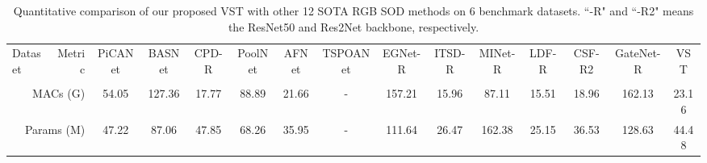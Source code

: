 \documentclass[10pt,twocolumn,letterpaper]{article}
\begin{document}
\begin{table*}[t]
  \centering
  \footnotesize
  \renewcommand{\arraystretch}{1.0}
  \renewcommand{\tabcolsep}{1mm}
 \caption{Quantitative comparison of our proposed VST with other 12 SOTA RGB SOD methods on 6 benchmark datasets. ``-R" and ``-R2" means the ResNet50 and Res2Net backbone, respectively.}
  \begin{tabular}{lr|cccccccccccc|c}
  \hline

    Dataset
    & Metric
    & PiCANet & BASNet & CPD-R & PoolNet  & AFNet & TSPOANet & EGNet-R & ITSD-R & MINet-R & LDF-R & CSF-R2 & GateNet-R & VST\\
    &
    & \cite{liu2018picanet} &\cite{Qin19BASNet} & \cite{Wu_CPD}   & \cite{Liu19PoolNet} & \cite{Feng_AFNet}& \cite{Liu_TSPOANet} & \cite{zhao2019EGNet} & \cite{Zhou2020ITSD} & \cite{MINet-CVPR2020} &\cite{CVPR2020_LDF} & \cite{gao2020sod100k} &\cite{GateNet}\\ \hline

   \multicolumn{2}{r|}{MACs (G)}  &54.05 &127.36 &17.77 &88.89	&21.66	&-	&157.21	&15.96 &87.11 &15.51 &18.96	&162.13	&23.16\\
   \multicolumn{2}{r|}{Params (M)}  &47.22	&87.06 &47.85 &68.26 &35.95	&- &111.64 &26.47 &162.38 &25.15 &36.53	&128.63	&44.48\\
     \hline
     

\end{tabular}
\end{table*}
\end{document}
